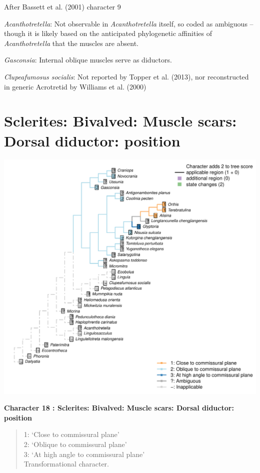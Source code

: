 \documentclass[]{book}
\theoremstyle{definition}
\theoremstyle{definition}
\theoremstyle{definition}
\theoremstyle{remark}
\begin{document}
After Bassett et al. (2001) character 9

\emph{Acanthotretella}: Not observable in \emph{Acanthotretella} itself,
so coded as ambiguous -- though it is likely based on the anticipated
phylogenetic affinities of \emph{Acanthotretella} that the muscles are
absent.

\emph{Gasconsia}: Internal oblique muscles serve as diductors.

\emph{Clupeafumosus socialis}: Not reported by Topper et al. (2013), nor
reconstructed in generic Acrotretid by Williams et al. (2000)

\hypertarget{sclerites-bivalved-muscle-scars-dorsal-diductor-position}{%
\section*{Sclerites: Bivalved: Muscle scars: Dorsal diductor:
position}\label{sclerites-bivalved-muscle-scars-dorsal-diductor-position}}

\includegraphics{Brachiopod_phylogeny_files/figure-latex/unnamed-chunk-5-18.pdf}

\textbf{Character 18 : Sclerites: Bivalved: Muscle scars: Dorsal
diductor: position }

\begin{quote}
1: `Close to commissural plane'\\
2: `Oblique to commissural plane'\\
3: `At high angle to commissural plane'\\
Transformational character.
\end{quote}
\end{document}
